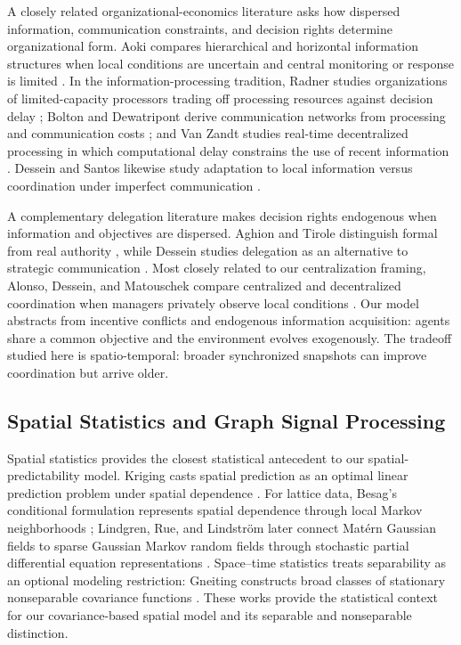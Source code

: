\documentclass[11pt]{article}
\begin{document}
A closely related organizational-economics literature asks how dispersed information, communication constraints, and decision rights determine organizational form. Aoki compares hierarchical and horizontal information structures when local conditions are uncertain and central monitoring or response is limited \cite{aoki1986horizontal}. In the information-processing tradition, Radner studies organizations of limited-capacity processors trading off processing resources against decision delay \cite{radner1993organization}; Bolton and Dewatripont derive communication networks from processing and communication costs \cite{bolton1994firm}; and Van Zandt studies real-time decentralized processing in which computational delay constrains the use of recent information \cite{vanzandt1999realtime}. Dessein and Santos likewise study adaptation to local information versus coordination under imperfect communication \cite{dessein2006adaptive}.

A complementary delegation literature makes decision rights endogenous when information and objectives are dispersed. Aghion and Tirole distinguish formal from real authority \cite{aghion1997formal}, while Dessein studies delegation as an alternative to strategic communication \cite{dessein2002authority}. Most closely related to our centralization framing, Alonso, Dessein, and Matouschek compare centralized and decentralized coordination when managers privately observe local conditions \cite{alonso2008coordination}. Our model abstracts from incentive conflicts and endogenous information acquisition: agents share a common objective and the environment evolves exogenously. The tradeoff studied here is spatio-temporal: broader synchronized snapshots can improve coordination but arrive older. 

\subsection{Spatial Statistics and Graph Signal Processing}
\label{subsec:related_spatial}

Spatial statistics provides the closest statistical antecedent to our spatial-predictability model. Kriging casts spatial prediction as an optimal linear prediction problem under spatial dependence \cite{cressie1990origins}. For lattice data, Besag's conditional formulation represents spatial dependence through local Markov neighborhoods \cite{besag1974spatial}; Lindgren, Rue, and Lindstr\"om later connect Mat\'ern Gaussian fields to sparse Gaussian Markov random fields through stochastic partial differential equation representations \cite{lindgren2011explicit}. Space--time statistics treats separability as an optional modeling restriction: Gneiting constructs broad classes of stationary nonseparable covariance functions \cite{gneiting2002nonseparable}. These works provide the statistical context for our covariance-based spatial model and its separable and nonseparable distinction.
\end{document}
